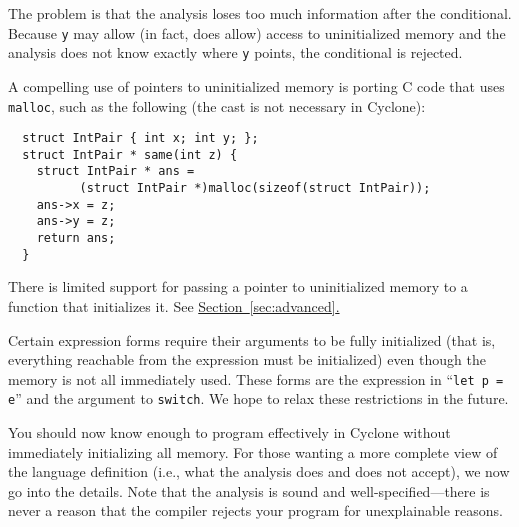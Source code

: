 The problem is that the analysis loses too much information after the
conditional.  Because \texttt{y} may allow (in fact, does allow)
access to uninitialized memory and the analysis does not know exactly
where \texttt{y} points, the conditional is rejected.

A compelling use of pointers to uninitialized memory is porting C code
that uses \texttt{malloc}, such as the following (the cast is not
necessary in Cyclone):
\begin{verbatim}
  struct IntPair { int x; int y; };
  struct IntPair * same(int z) {
    struct IntPair * ans = 
          (struct IntPair *)malloc(sizeof(struct IntPair));
    ans->x = z;
    ans->y = z;
    return ans;
  }
\end{verbatim}

There is limited support for passing a pointer to uninitialized memory
to a function that initializes it.  See
\hyperref[sec:advanced]{Section~\ref{sec:advanced}.}

Certain expression forms require their arguments to be fully
initialized (that is, everything reachable from the expression must be
initialized) even though the memory is not all immediately used.
These forms are the expression in ``\texttt{let p = e}'' and the
argument to \texttt{switch}.  We hope to relax these restrictions in
the future.

You should now know enough to program effectively in Cyclone without
immediately initializing all memory.  For those wanting a more
complete view of the language definition (i.e., what the analysis does
and does not accept), we now go into the details.  Note that the
analysis is sound and well-specified---there is never a reason that
the compiler rejects your program for unexplainable reasons.


